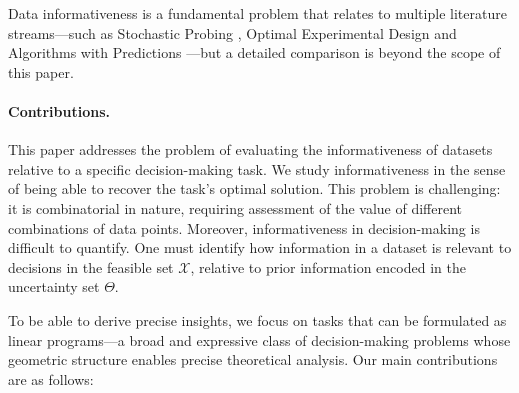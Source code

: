 \documentclass[11pt]{article}
\theoremstyle{plain}
\theoremstyle{definition}
\newcommand{\OB}[1]{\noindent{\textcolor{blue}{\{{\textbf{OB}:} #1\}}}}
\newcommand{\cX}{\mathcal{X}}
\begin{document}
Data informativeness is a fundamental problem that relates to multiple literature streams---such as Stochastic Probing \citep{weitzmanOptimalSearch1979,singlaPriceInformationCombinatorial2018, gallegoConstructiveProphet2022}, Optimal Experimental Design \citep{chalonerBayesianExperimental1995,singhApproximationAlgorithms2020}
and Algorithms with Predictions \citep{mitzenmacherAlgorithmsPredictions2020}---but a detailed comparison is beyond the scope of this paper. 


\paragraph{Contributions.}
This paper addresses the problem of evaluating the informativeness of datasets relative to a specific decision-making task. We study informativeness in the sense of being able to recover the task's optimal solution.
This problem is challenging: it is combinatorial in nature, requiring assessment of the value of different combinations of data points. 
Moreover, informativeness in decision-making is difficult to quantify. One must identify how information in a dataset is relevant to decisions in the feasible set $\cX$, relative to prior information encoded in the uncertainty set $\Theta$.

To be able to derive precise insights, we focus on tasks that can be formulated as linear programs---a broad and expressive class of decision-making problems whose geometric structure enables precise theoretical analysis. 
Our main contributions are as follows:



 
\end{document}
